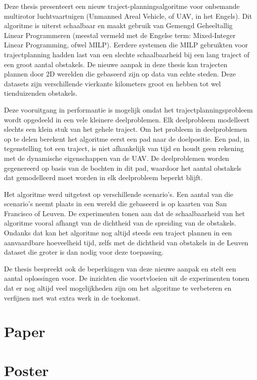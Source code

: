 \documentclass[
master=cws,
masteroption=ai,
english,
]{kulemt}
\begin{document}
\begin{abstract*}
Deze thesis presenteert een nieuw traject-planningsalgoritme voor onbemande multirotor luchtvaartuigen (Unmanned Areal Vehicle, of UAV, in het Engels). Dit algoritme is uiterst schaalbaar en maakt gebruik van Gemengd  Geheeltallig Linear Programmeren (meestal vermeld met de Engelse term: Mixed-Integer Linear Programming, ofwel MILP). Eerdere systemen die MILP gebruikten voor trajectplanning hadden last van een slechte schaalbaarheid bij een lang traject of een groot aantal obstakels. De nieuwe aanpak in deze thesis kan trajecten plannen door 2D werelden die gebaseerd zijn op data van echte steden. Deze datasets zijn verschillende vierkante kilometers groot en hebben tot wel tienduizenden obstakels.
\par
Deze vooruitgang in performantie is mogelijk omdat het trajectplanningsprobleem wordt opgedeeld in een vele kleinere deelproblemen. Elk deelprobleem modelleert slechts een klein stuk van het gehele traject. Om het probleem in deelproblemen op te delen berekent het algoritme eerst een pad naar de doelpositie. Een pad, in tegenstelling tot een traject, is niet afhankelijk van tijd en houdt geen rekening met de dynamische eigenschappen van de UAV. De deelproblemen worden gegenereerd op basis van de bochten in dit pad, waardoor het aantal obstakels dat gemodelleerd moet worden in elk deelprobleem beperkt blijft.
\par
Het algoritme werd uitgetest op verschillende scenario's. Een aantal van die scenario's neemt plaats in een wereld die gebaseerd is op kaarten van San Francisco of Leuven. De experimenten tonen aan dat de schaalbaarheid van het algoritme vooral afhangt van de dichtheid van de spreiding van de obstakels. Ondanks dat kan het algoritme nog altijd steeds een traject plannen in een aanvaardbare hoeveelheid tijd, zelfs met de dichtheid van obstakels in de Leuven dataset die groter is dan nodig voor deze toepassing.
\par
De thesis bespreekt ook de beperkingen van deze nieuwe aanpak en stelt een aantal oplossingen voor. De inzichten die voortvloeien uit de experimenten tonen dat er nog altijd veel mogelijkheden zijn om het algoritme te verbeteren en verfijnen met wat extra werk in de toekomst.
\end{abstract*}

\listoffigures
\listoftables

\mainmatter

\clearpage

\clearpage

\clearpage

\clearpage

\clearpage

\clearpage
%

\clearpage

\appendixpage*
\appendix
\chapter{Paper}

\chapter{Poster}


\backmatter



\end{document}
